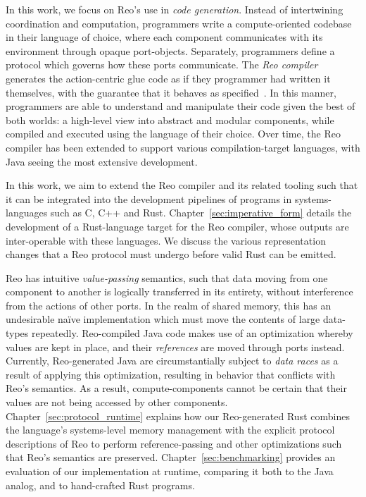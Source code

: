 In this work, we focus on Reo's use in \textit{code generation}. Instead of intertwining coordination and computation, programmers write a compute-oriented codebase in their language of choice, where each component communicates with its environment through opaque port-objects. Separately, programmers define a protocol which governs how these ports communicate. The \textit{Reo compiler} generates the action-centric glue code as if they programmer had written it themselves, with the guarantee that it behaves as specified~\cite{jongmans2013modularizing}. In this manner, programmers are able to understand and manipulate their code given the best of both worlds: a high-level view into abstract and modular components, while compiled and executed using the language of their choice. Over time, the Reo compiler has been extended to support various compilation-target languages, with Java seeing the most extensive development. 

In this work, we aim to extend the Reo compiler and its related tooling such that it can be integrated into the development pipelines of programs in systems-languages such as C, C++ and Rust. Chapter~\ref{sec:imperative_form} details the development of a Rust-language target for the Reo compiler, whose outputs are inter-operable with these languages. We discuss the various representation changes that a Reo protocol must undergo before valid Rust can be emitted.

Reo has intuitive \textit{value-passing} semantics, such that data moving from one component to another is logically transferred in its entirety, without interference from the actions of other ports. In the realm of shared memory, this has an undesirable na\"ive implementation which must move the contents of large data-types repeatedly. Reo-compiled Java code makes use of an optimization whereby values are kept in place, and their \textit{references} are moved through ports instead. Currently, Reo-generated Java are circumstantially subject to \textit{data races} as a result of applying this optimization, resulting in behavior that conflicts with Reo's semantics. As a result, compute-components cannot be certain that their values are not being accessed by other components. Chapter~\ref{sec:protocol_runtime} explains how our Reo-generated Rust combines the language's systems-level memory management with the explicit protocol descriptions of Reo to perform reference-passing and other optimizations such that Reo's semantics are preserved. Chapter~\ref{sec:benchmarking} provides an evaluation of our implementation at runtime, comparing it both to the Java analog, and to hand-crafted Rust programs.


